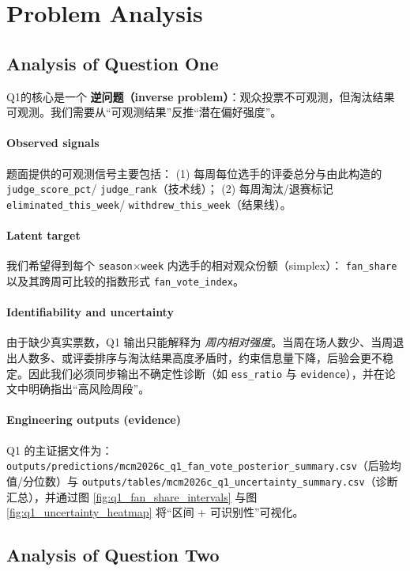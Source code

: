 \newpage
\section{Problem Analysis}
\subsection{Analysis of Question One}

Q1的核心是一个 \textbf{逆问题（inverse problem）}：观众投票不可观测，但淘汰结果可观测。我们需要从“可观测结果”反推“潜在偏好强度”。

\paragraph{Observed signals}
题面提供的可观测信号主要包括：
(1) 每周每位选手的评委总分与由此构造的 \texttt{judge\_score\_pct}/ \texttt{judge\_rank}（技术线）；
(2) 每周淘汰/退赛标记 \texttt{eliminated\_this\_week}/ \texttt{withdrew\_this\_week}（结果线）。

\paragraph{Latent target}
我们希望得到每个 \texttt{season$\times$week} 内选手的相对观众份额（simplex）：
\texttt{fan\_share} 以及其跨周可比较的指数形式 \texttt{fan\_vote\_index}。

\paragraph{Identifiability and uncertainty}
由于缺少真实票数，Q1 输出只能解释为 \emph{周内相对强度}。当周在场人数少、当周退出人数多、或评委排序与淘汰结果高度矛盾时，约束信息量下降，后验会更不稳定。因此我们必须同步输出不确定性诊断（如 \texttt{ess\_ratio} 与 \texttt{evidence}），并在论文中明确指出“高风险周段”。

\paragraph{Engineering outputs (evidence)}
Q1 的主证据文件为：
\texttt{outputs/predictions/mcm2026c\_q1\_fan\_vote\_posterior\_summary.csv}（后验均值/分位数）与 \texttt{outputs/tables/mcm2026c\_q1\_uncertainty\_summary.csv}（诊断汇总），并通过图 \ref{fig:q1_fan_share_intervals} 与图 \ref{fig:q1_uncertainty_heatmap} 将“区间 + 可识别性”可视化。

\subsection{Analysis of Question Two} 

